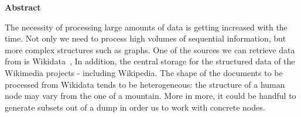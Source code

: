 \thispagestyle{empty}

\vspace*{\fill}

\begin{center}
	\large
	{\bf Abstract}\\[5mm]
\end{center}
The necessity of processing large amounts of data is getting increased with the time. Not only we need to process high volumes of sequential information, but more complex structures such as graphs. One of the sources we can retrieve data from is Wikidata~\cite{web:wikidata},  In addition, the central storage for the structured data of the Wikimedia projects - including Wikipedia. The shape of the documents to be processed from Wikidata tends to be heterogeneous: the structure of a human node may vary from the one of a mountain. More in more, it could be handful to generate subsets out of a dump in order us to work with concrete nodes.

\vspace*{\fill}